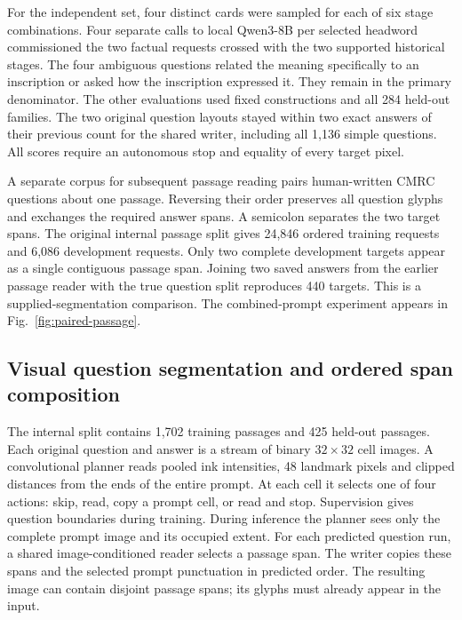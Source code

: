 \documentclass[12pt,a4paper]{article}
\providecommand{\DIFadd}[1]{{\protect\color{blue} \sf #1}} %
\begin{document}
\DIFadd{For the independent set, four distinct cards were sampled for each of six stage combinations. Four separate calls to local Qwen3-8B per selected headword commissioned the two factual requests crossed with the two supported historical stages. The four ambiguous questions related the meaning specifically to an inscription or asked how the inscription expressed it. They remain in the primary denominator. The other evaluations used fixed constructions and all 284 held-out families. The two original question layouts stayed within two exact answers of their previous count for the shared writer, including all 1,136 simple questions. All scores require an autonomous stop and equality of every target pixel.
}

\DIFadd{A separate corpus for subsequent passage reading pairs human-written CMRC questions about one passage. Reversing their order preserves all question glyphs and exchanges the required answer spans. A semicolon separates the two target spans. The original internal passage split gives 24,846 ordered training requests and 6,086 development requests. Only two complete development targets appear as a single contiguous passage span. Joining two saved answers from the earlier passage reader with the true question split reproduces 440 targets. This is a supplied-segmentation comparison. The combined-prompt experiment appears in Fig.~\ref{fig:paired-passage}.
}

\subsection*{\DIFadd{Visual question segmentation and ordered span composition}}
\DIFadd{The internal split contains 1,702 training passages and 425 held-out passages. Each original question and answer is a stream of binary $32\times32$ cell images. A convolutional planner reads pooled ink intensities, 48 landmark pixels and clipped distances from the ends of the entire prompt. At each cell it selects one of four actions: skip, read, copy a prompt cell, or read and stop. Supervision gives question boundaries during training. During inference the planner sees only the complete prompt image and its occupied extent. For each predicted question run, a shared image-conditioned reader selects a passage span. The writer copies these spans and the selected prompt punctuation in predicted order. The resulting image can contain disjoint passage spans; its glyphs must already appear in the input.
}
\end{document}
